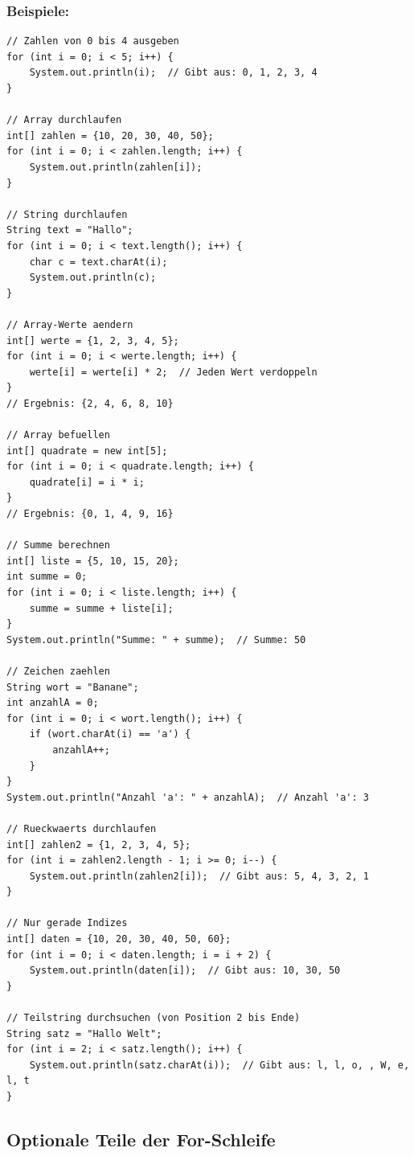 \subsubsection*{Beispiele:}
\begin{lstlisting}
// Zahlen von 0 bis 4 ausgeben
for (int i = 0; i < 5; i++) {
    System.out.println(i);  // Gibt aus: 0, 1, 2, 3, 4
}

// Array durchlaufen
int[] zahlen = {10, 20, 30, 40, 50};
for (int i = 0; i < zahlen.length; i++) {
    System.out.println(zahlen[i]);
}

// String durchlaufen
String text = "Hallo";
for (int i = 0; i < text.length(); i++) {
    char c = text.charAt(i);
    System.out.println(c);
}

// Array-Werte aendern
int[] werte = {1, 2, 3, 4, 5};
for (int i = 0; i < werte.length; i++) {
    werte[i] = werte[i] * 2;  // Jeden Wert verdoppeln
}
// Ergebnis: {2, 4, 6, 8, 10}

// Array befuellen
int[] quadrate = new int[5];
for (int i = 0; i < quadrate.length; i++) {
    quadrate[i] = i * i;
}
// Ergebnis: {0, 1, 4, 9, 16}

// Summe berechnen
int[] liste = {5, 10, 15, 20};
int summe = 0;
for (int i = 0; i < liste.length; i++) {
    summe = summe + liste[i];
}
System.out.println("Summe: " + summe);  // Summe: 50

// Zeichen zaehlen
String wort = "Banane";
int anzahlA = 0;
for (int i = 0; i < wort.length(); i++) {
    if (wort.charAt(i) == 'a') {
        anzahlA++;
    }
}
System.out.println("Anzahl 'a': " + anzahlA);  // Anzahl 'a': 3

// Rueckwaerts durchlaufen
int[] zahlen2 = {1, 2, 3, 4, 5};
for (int i = zahlen2.length - 1; i >= 0; i--) {
    System.out.println(zahlen2[i]);  // Gibt aus: 5, 4, 3, 2, 1
}

// Nur gerade Indizes
int[] daten = {10, 20, 30, 40, 50, 60};
for (int i = 0; i < daten.length; i = i + 2) {
    System.out.println(daten[i]);  // Gibt aus: 10, 30, 50
}

// Teilstring durchsuchen (von Position 2 bis Ende)
String satz = "Hallo Welt";
for (int i = 2; i < satz.length(); i++) {
    System.out.println(satz.charAt(i));  // Gibt aus: l, l, o, , W, e, l, t
}
\end{lstlisting}

\newpage


\subsection*{Optionale Teile der For-Schleife}

